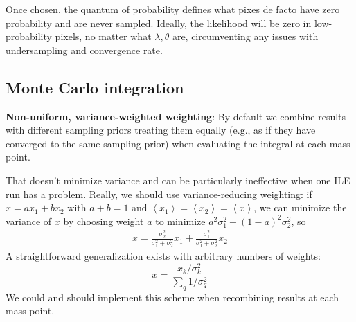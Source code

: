 Once chosen, the quantum of probability defines what pixes de facto have zero probability and are never sampled. 
Ideally, the likelihood will be zero in  low-probability pixels, no matter what $\lambda,\theta$ are, circumventing
any issues with undersampling and convergence rate.


\subsection{Monte Carlo integration}
\textbf{Non-uniform, variance-weighted weighting}: By default we combine results with different sampling priors treating
them equally (e.g., as if they have converged to the same sampling prior) when evaluating the integral at each mass
point.  

That doesn't minimize variance and can be particularly
ineffective when one ILE run has a problem.  Really, we should use variance-reducing weighting: if $x=ax_1 +b x_2$ with $a+b=1$ and
$\left<x_1\right> =\left<x_2\right> =\left<x\right>$, we can minimize the variance of $x$ by choosing weight $a$ to
minimize $a^2 \sigma_1^2 + (1-a)^2 \sigma_2^2$, so 
\begin{eqnarray}
x = \frac{\sigma_2^2}{\sigma_1^2+\sigma_2^2} x_1 +  \frac{\sigma_1^2}{\sigma_1^2+\sigma_2^2} x_2
\end{eqnarray}
A straightforward generalization exists with arbitrary numbers of weights:
\[
x = \frac{x_k/\sigma_k^2}{\sum_q 1/\sigma_q^2}
\]
We could and should implement this scheme when recombining results at each mass point. 

